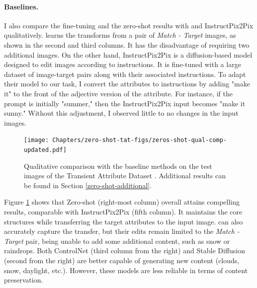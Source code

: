 \paragraph{Baselines.} I also compare the fine-tuning and the zero-shot results with \citeauthor{laffont2014transient} \cite{laffont2014transient} and InstructPix2Pix \cite{brooks2023instructpix2pix} qualitatively. \citeauthor{laffont2014transient} \cite{laffont2014transient} learns the transforms from a pair of \textit{ Match - Target} images, as shown in the second and third columns. It has the disadvantage of requiring two additional images. On the other hand, InstructPix2Pix \cite{brooks2023instructpix2pix} is a diffusion-based model designed to edit images according to instructions. It is fine-tuned with a large dataset of image-target pairs along with their associated instructions. To adapt their model to our task, I convert the attributes to instructions by adding "make it" to the front of the adjective version of the attribute. For instance, if the prompt is initially "summer," then the InstructPix2Pix input becomes "make it sunny." Without this adjustment, I observed little to no changes in the input images.


 
 \begin{figure}[ht]
  \texttt{[image: Chapters/zero-shot-tat-figs/zeros-shot-qual-comp-updated.pdf]}
  \caption{Qualitative comparison with the baseline methods on the test images of the Transient Attribute Dataset \cite{laffont2014transient}. Additional results can be found in Section \ref{zero-shot-additional}.}
  \label{fig:zero-shot-comparison}
\end{figure}

Figure \ref{fig:zero-shot-comparison} shows that Zero-shot (right-most column) overall attains compelling results, comparable with InstructPix2Pix (fifth column). It maintains the core structures while transferring the target attributes to the input image. \citeauthor{laffont2014transient} \cite{laffont2014transient} can also accurately capture the transfer, but their edits remain limited to the \textit{Match - Target} pair, being unable to add some additional content, such as snow or raindrops. Both ControlNet (third column from the right) and Stable Diffusion (second from the right) are better capable of generating new content (clouds, snow, daylight, etc.). However, these models are less reliable in terms of content preservation. 

